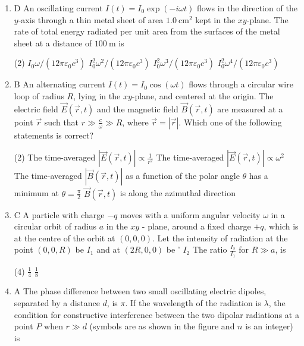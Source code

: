 \begin{enumerate}
\item D An oscillating current $I(t)=I_{0} \exp (-i \omega t)$ flows in the direction of the $y$-axis through a thin metal sheet of area $1.0 \mathrm{~cm}^{2}$ kept in the $x y$-plane. The rate of total energy radiated per unit area from the surfaces of the metal sheet at a distance of $100 \mathrm{~m}$ is
{}
 \begin{tasks}(2)
	\task[\textbf{a.}]$I_{0} \omega /\left(12 \pi \varepsilon_{0} c^{3}\right)$
	\task[\textbf{b.}]$I_{0}^{2} \omega^{2} /\left(12 \pi \varepsilon_{0} c^{3}\right)$
	\task[\textbf{c.}]$I_{0}^{2} \omega^{3} /\left(12 \pi \varepsilon_{0} c^{3}\right)$
	\task[\textbf{d.}] $I_{0}^{2} \omega^{4} /\left(12 \pi \varepsilon_{0} c^{3}\right)$
\end{tasks}
\item B An alternating current $I(t)=I_{0} \cos (\omega t)$ flows through a circular wire loop of radius $R$, lying in the $x y$-plane, and centered at the origin. The electric field $\vec{E}(\vec{r}, t)$ and the magnetic field $\vec{B}(\vec{r}, t)$ are measured at a point $\vec{r}$ such that $r \gg \frac{c}{\omega} \gg R$, where $\vec{r}=|\vec{r}|$.
Which one of the following statements is correct?
{}
 \begin{tasks}(2)
	\task[\textbf{a.}] The time-averaged $|\vec{E}(\vec{r}, t)| \propto \frac{1}{r^{2}}$
	\task[\textbf{b.}]The time-averaged $|\vec{E}(\vec{r}, t)| \propto \omega^{2}$
	\task[\textbf{c.}]The time-averaged $|\vec{B}(\vec{r}, t)|$ as a function of the polar angle $\theta$ has a minimum at $\theta=\frac{\pi}{2}$
	\task[\textbf{d.}] $\vec{B}(\vec{r}, t)$ is along the azimuthal direction
\end{tasks}
\item  C A particle with charge $-q$ moves with a uniform angular velocity $\omega$ in a circular orbit of radius $a$ in the $x y$ - plane, around a fixed charge $+q$, which is at the centre of the orbit at $(0,0,0)$. Let the intensity of radiation at the point $(0,0, R)$ be $I_{1}$ and at $(2 R, 0,0)$ be ' $I_{2}$ The ratio $\frac{I_{2}}{I_{1}}$ for $R \gg a$, is
{}
 \begin{tasks}(4)
	\task[\textbf{b.}]$\frac{1}{4}$
	\task[\textbf{c.}]$\frac{1}{8}$
\end{tasks}
\item A The phase difference between two small oscillating electric dipoles, separated by a distance $d$, is $\pi$. If the wavelength of the radiation is $\lambda$, the condition for constructive interference between the two dipolar radiations at a point $P$ when $r \gg d$ (symbols are as shown in the figure and $n$ is an integer) is

\end{enumerate}
